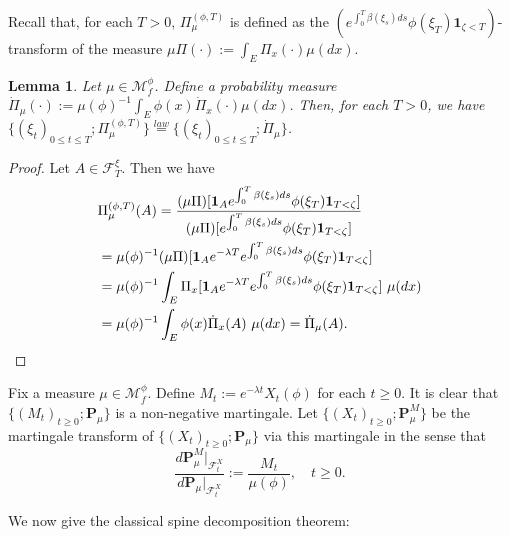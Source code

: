\documentclass[UTF8]{pkuthss}
\theoremstyle{plain}
\newtheorem{lem}[thm]{Lemma}
\theoremstyle{definition}
\numberwithin{equation}{section}
\begin{document}
Recall that, for each $T>0$, $\Pi^{(\phi,T)}_\mu$ is defined as the $(e^{\int_0^T\beta(\xi_s)ds} \phi(\xi_T)\mathbf 1_{\zeta < T})$-transform of the measure 
	$\mu\Pi(\cdot):= \int_E \Pi_x(\cdot)\mu(dx)$.
\begin{lem}
\label{lem: measure of spine}
	Let $\mu \in \mathcal M_f^\phi$. Define
   a probability measure
	$\dot {\Pi}_\mu(\cdot):= \mu(\phi)^{-1}\int_E \phi(x)\dot {\Pi}_x(\cdot )\mu(dx)$.
Then, for each $T>0$, we have $\{(\xi_t)_{0\leq t\leq T}; \Pi_\mu^{(\phi,T)}\}\overset{law}{=}\{(\xi_t)_{0\leq t\leq T}; \dot{\Pi}_\mu\}$.
\end{lem}
\begin{proof}
	Let $A\in \mathscr F_T^\xi$. Then we have
\begin{align}
	&\Pi_\mu^{(\phi,T)}(A) = \frac{(\mu\Pi)[\mathbf 1_A e^{\int_0^T\beta(\xi_s)ds} \phi(\xi_T)\mathbf 1_{T < \zeta}]}{(\mu\Pi)[e^{\int_0^T\beta(\xi_s)ds} \phi(\xi_T)\mathbf 1_{T < \zeta}]}
	\\&=  \mu(\phi)^{-1}(\mu\Pi)[\mathbf 1_A e^{-\lambda T}e^{\int_0^T\beta(\xi_s)ds} \phi(\xi_T)\mathbf 1_{T < \zeta}]
	\\&=  \mu(\phi)^{-1}\int_E\Pi_x[\mathbf 1_A e^{-\lambda T}e^{\int_0^T\beta(\xi_s)ds} \phi(\xi_T)\mathbf 1_{T < \zeta}]~\mu(dx)
	\\&=  \mu(\phi)^{-1}\int_E\phi(x)\dot{\Pi}_x (A)~\mu(dx) = \dot{\Pi}_\mu(A). \qedhere
\end{align}
\end{proof}
\par
	Fix a measure $\mu \in \mathcal M^\phi_f$.
	Define $M_t := e^{-\lambda t}X_t(\phi)$ for each $t \geq 0$.
	It is clear that $\{(M_t)_{t\geq 0}; \mathbf P_\mu\}$ is a non-negative martingale.
	Let $\{(X_t)_{t\geq 0}; \mathbf P_\mu^M\}$ be the martingale transform of $\{(X_t)_{t\geq 0}; \mathbf P_\mu\}$ via this martingale in the sense that
\[
	\frac {d \mathbf P_\mu^M |_{\mathscr F_t^X}} {d \mathbf P_\mu |_{\mathscr F_t^X}}
	:= \frac {M_t} {\mu(\phi)},
	\quad t \geq 0.
\]
\par
	We now give the classical spine decomposition theorem:
\end{document}
